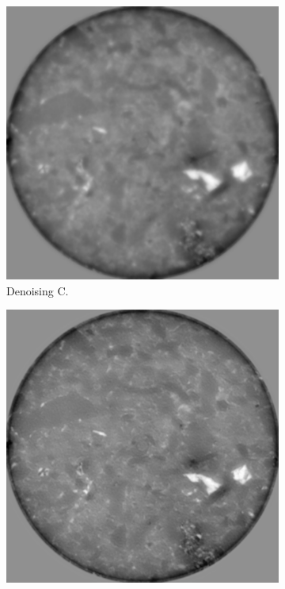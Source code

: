\begin{figure}
  \medskip

  \begin{subfigure}[t]{.45\textwidth}
    \centering
    \includegraphics[width=\linewidth]{figures/shale/shale_dn_tomo00002/0.png}
    \caption{Denoising C. }
    \label{fig:shale:c}
  \end{subfigure}
  \hfill
  \begin{subfigure}[t]{.45\textwidth}
    \centering
    \includegraphics[width=\linewidth]{figures/shale/shale_dn_tomo00002min7/0.png}

\end{subfigure}
\end{figure}
